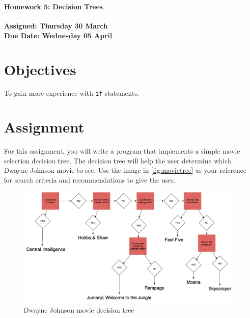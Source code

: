 \documentclass[letter,11pt]{article}
\begin{document}
\huge
\textbf{Homework 5: Decision Trees}.
\normalsize
\\ ~~ \\
\textbf{Assigned: Thursday 30 March} \\
\textbf{Due Date: Wednesday 05 April}

\section*{Objectives}
\paragraph{}To gain more experience with \texttt{if} statements.

\FloatBarrier
\section*{Assignment}
\paragraph{}For this assignment, you will write a program that implements a simple movie selection decision tree. The decision tree will help the user determine which Dwayne Johnson movie to see. Use the image in \autoref{fig:movietree} as your reference for search criteria and recommendations to give the user.

\begin{figure}[h!]
    \centering
    \includegraphics[scale=0.41]{Homework/Homework 05 - Dwayne Johnson Movie Decision Tree.png}
    \caption{Dwayne Johnson movie decision tree}
    \label{fig:movietree}
\end{figure}
\end{document}
